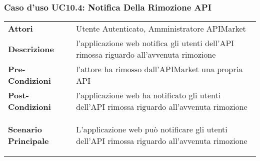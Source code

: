 \subsubsection{Caso d'uso UC10.4: Notifica Della Rimozione API}
\label{UC10.4}

\renewcommand*{\arraystretch}{1.6}
\begin{longtable}{ l | p{11cm}}
	\hline
	\rowcolor{Gray}
	\multicolumn{2}{c}{UC10.4: Notifica Della Rimozione API} \\
	\hline
	\textbf{Attori} &Utente Autenticato, Amministratore APIMarket \\
	\textbf{Descrizione} & l'applicazione web notifica gli utenti dell'API rimossa riguardo all'avvenuta rimozione\\
	\textbf{Pre-Condizioni} & l'attore ha rimosso dall'APIMarket una propria API\\
	\textbf{Post-Condizioni}& l'applicazione web ha notificato gli utenti dell'API rimossa riguardo all'avvenuta rimozione\\
	\textbf{Scenario Principale} & \begin{enumerate*}[label=(\arabic*.),itemjoin={\newline}]
		\item L'applicazione web può notificare gli utenti dell'API rimossa riguardo all'avvenuta rimozione
	\end{enumerate*}\\
\end{longtable}



